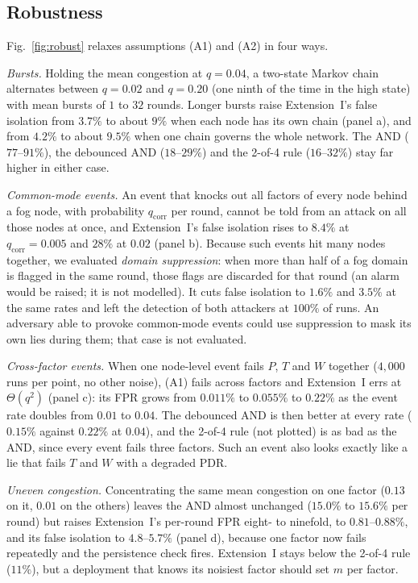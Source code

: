 \documentclass[lineno,pdflatex,sn-nature]{sn-jnl}
\theoremstyle{thmstyleone}%
\theoremstyle{thmstylethree}%
\begin{document}
\subsection{Robustness}
\label{sec:res-robust}
Fig.~\ref{fig:robust} relaxes assumptions (A1) and (A2) in four ways.

\emph{Bursts.}  Holding the mean congestion at $q=0.04$, a two-state
Markov chain alternates between $q=0.02$ and $q=0.20$ (one ninth of
the time in the high state) with mean bursts of $1$ to $32$ rounds.
Longer bursts raise Extension~I's false isolation from $3.7\%$ to
about $9\%$ when each node has its own chain (panel a), and from
$4.2\%$ to about $9.5\%$ when one chain governs the whole network.  The AND
($77$--$91\%$), the debounced AND ($18$--$29\%$) and the 2-of-4 rule
($16$--$32\%$) stay far higher in either case.

\emph{Common-mode events.}  An event that knocks out all factors of
every node behind a fog node, with probability $q_{\mathrm{corr}}$ per
round, cannot be told from an attack on all those nodes at once, and
Extension~I's false isolation rises to $8.4\%$ at
$q_{\mathrm{corr}}=0.005$ and $28\%$ at $0.02$ (panel b).  Because such
events hit many nodes together, we evaluated \emph{domain
suppression}: when more than half of a fog domain is flagged in the
same round, those flags are discarded for that round (an alarm would
be raised; it is not modelled).  It cuts
false isolation to $1.6\%$ and $3.5\%$ at the same rates and left the
detection of both attackers at $100\%$ of runs.  An adversary able to provoke
common-mode events could use suppression to mask its own lies during
them; that case is not evaluated.

\emph{Cross-factor events.}  When one node-level event fails $P$, $T$
and $W$ together ($4{,}000$ runs per point, no other noise), (A1) fails
across factors and Extension~I errs at $\Theta(q^{2})$ (panel c): its
FPR grows from $0.011\%$ to $0.055\%$ to $0.22\%$ as the event rate
doubles from $0.01$ to $0.04$.  The debounced AND is then better
at every rate ($0.15\%$ against $0.22\%$ at $0.04$), and the 2-of-4 rule (not plotted) is as bad
as the AND, since every event fails three factors.  Such an event also
looks exactly like a lie that fails $T$ and $W$ with a degraded PDR.

\emph{Uneven congestion.}  Concentrating the same mean congestion on
one factor ($0.13$ on it, $0.01$ on the others) leaves the AND
almost unchanged ($15.0\%$ to $15.6\%$ per round) but raises Extension~I's per-round FPR eight- to ninefold, to
$0.81$--$0.88\%$, and its false isolation to $4.8$--$5.7\%$ (panel d),
because one factor now fails repeatedly and the persistence check
fires.  Extension~I stays below the 2-of-4 rule ($11\%$), but a
deployment that knows its noisiest factor should set $m$ per factor.
\end{document}
